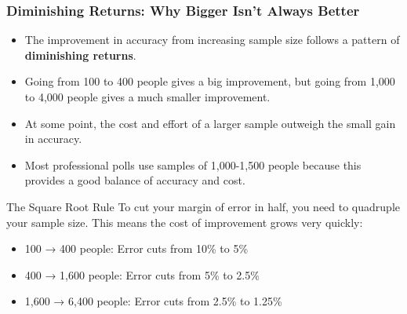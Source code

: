 \documentclass{beamer}
\begin{document}
	\begin{frame}
		\frametitle{Diminishing Returns: Why Bigger Isn't Always Better}
		
		\begin{itemize}
			\item The improvement in accuracy from increasing sample size follows a pattern of \textbf{diminishing returns}.
			\item Going from 100 to 400 people gives a big improvement, but going from 1,000 to 4,000 people gives a much smaller improvement.
			\item At some point, the cost and effort of a larger sample outweigh the small gain in accuracy.
			\item Most professional polls use samples of 1,000-1,500 people because this provides a good balance of accuracy and cost.
		\end{itemize}
		
		\begin{block}{The Square Root Rule}
			To cut your margin of error in half, you need to quadruple your sample size. This means the cost of improvement grows very quickly:
			\begin{itemize}
				\item 100 → 400 people: Error cuts from 10\% to 5\%
				\item 400 → 1,600 people: Error cuts from 5\% to 2.5\%
				\item 1,600 → 6,400 people: Error cuts from 2.5\% to 1.25\%
			\end{itemize}
		\end{block}
		
	\end{frame}
	
\end{document}
